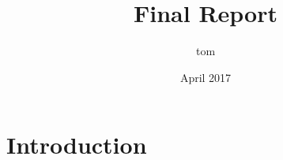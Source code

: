 \documentclass{article}
\title{Final Report}
\author{tom }
\date{April 2017}
\begin{document}
\maketitle

\section{Introduction}

\end{document}
